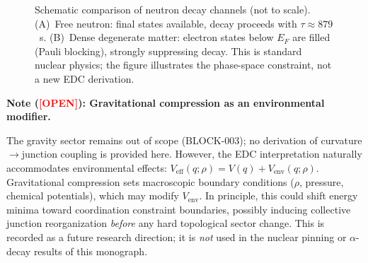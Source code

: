\documentclass[11pt,a4paper]{article}
\newcommand{\tagOPEN}{\textcolor{red}{\textbf{[OPEN]}}}
\begin{document}
\begin{figure}[ht]
\centering
{}
\caption{Schematic comparison of neutron decay channels (not to scale). (A)~Free neutron: final states available, decay proceeds with $\tau \approx 879$~s. (B)~Dense degenerate matter: electron states below $E_F$ are filled (Pauli blocking), strongly suppressing decay. This is standard nuclear physics; the figure illustrates the phase-space constraint, not a new EDC derivation.}
\label{fig:ns_pauli_blocking_schematic}
\end{figure}

\begin{statusbox}
\textbf{Note (\tagOPEN{}): Gravitational compression as an environmental modifier.}

The gravity sector remains out of scope (BLOCK-003); no derivation of curvature$\to$junction coupling is provided here.
However, the EDC interpretation naturally accommodates environmental effects: $V_{\text{eff}}(q;\rho) = V(q) + V_{\text{env}}(q;\rho)$.
Gravitational compression sets macroscopic boundary conditions ($\rho$, pressure, chemical potentials), which may modify $V_{\text{env}}$.
In principle, this could shift energy minima toward coordination constraint boundaries, possibly inducing collective junction reorganization \emph{before} any hard topological sector change.
This is recorded as a future research direction; it is \emph{not} used in the nuclear pinning or $\alpha$-decay results of this monograph.
\end{statusbox}
\end{document}
